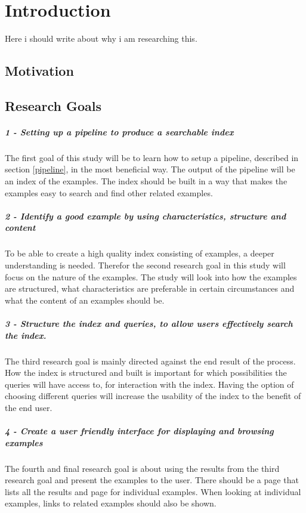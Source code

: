 
\chapter{Introduction}

Here i should write about why i am researching this.

\section{Motivation}

\section{Research Goals}

\paragraph{1 - Setting up a pipeline to produce a searchable index}
The first goal of this study will be to learn how to setup a pipeline, described in section \ref{pipeline}, in the most beneficial way. The output of the pipeline will be an index of the examples. The index should be built in a way that makes the examples easy to search and find other related examples.

\paragraph{2 - Identify a good example by using characteristics, structure and content}
To be able to create a high quality index consisting of examples, a deeper understanding is needed. Therefor the second research goal in this study will focus on the nature of the examples. The study will look into how the examples are structured, what characteristics are preferable in certain circumstances and what the content of an examples should be. 

\paragraph{3 - Structure the index and queries, to allow users effectively search the index.}
The third research goal is mainly directed against the end result of the process. How the index is structured and built is important for which possibilities the queries will have access to, for interaction with the index. Having the option of choosing different queries will increase the usability of the index to the benefit of the end user. 

\paragraph{4 - Create a user friendly interface for displaying and browsing examples}
The fourth and final research goal is about using the results from the third research goal and present the examples to the user. There should be a page that lists all the results and page for individual examples. When looking at individual examples, links to related examples should also be shown.


\cleardoublepage